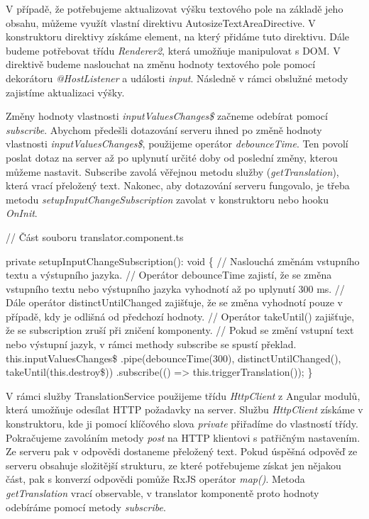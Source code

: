 V případě, že potřebujeme aktualizovat výšku textového pole na základě jeho obsahu, můžeme využít vlastní direktivu AutosizeTextAreaDirective. 
V konstruktoru direktivy získáme element, na který přidáme tuto direktivu. Dále budeme potřebovat třídu \emph{Renderer2}, která umožňuje manipulovat s DOM. 
V direktivě budeme naslouchat na změnu hodnoty textového pole pomocí dekorátoru \emph{@HostListener} a události \emph{input}. Následně v rámci obslužné metody zajistíme aktualizaci výšky.

Změny hodnoty vlastnosti \emph{inputValuesChanges\$} začneme odebírat pomocí \emph{subscribe}. 
Abychom předešli dotazování serveru ihned po změně hodnoty vlastnosti \emph{inputValuesChanges\$}, použijeme operátor \emph{debounceTime}. 
Ten povolí poslat dotaz na server až po uplynutí určité doby od poslední změny, kterou můžeme nastavit. 
Subscribe zavolá věřejnou metodu služby (\emph{getTranslation}), která vrací přeložený text. 
Nakonec, aby dotazování serveru fungovalo, je třeba metodu \emph{setupInputChangeSubscription} zavolat v konstruktoru nebo hooku \emph{OnInit}.

\begin{prog}
// Část souboru translator.component.ts

private setupInputChangeSubscription(): void \{
  // Naslouchá změnám vstupního textu a výstupního jazyka.
  // Operátor debounceTime zajistí, že se změna vstupního textu 
    nebo výstupního jazyka vyhodnotí až po uplynutí 300 ms.
  // Dále operátor distinctUntilChanged zajišťuje, 
    že se změna vyhodnotí pouze v případě, kdy je odlišná od předchozí hodnoty.
  // Operátor takeUntil() zajišťuje, 
    že se subscription zruší při zničení komponenty.
  // Pokud se změní vstupní text nebo výstupní jazyk, 
    v rámci methody subscribe se spustí překlad.
  this.inputValuesChanges\$
    .pipe(debounceTime(300), distinctUntilChanged(), takeUntil(this.destroy\$))
    .subscribe(() => this.triggerTranslation());
\}
\end{prog}

V rámci služby TranslationService použijeme třídu \emph{HttpClient} z Angular modulů, která umožňuje odesílat HTTP požadavky na server.
Službu \emph{HttpClient} získáme v konstruktoru, kde ji pomocí klíčového slova \emph{private} přiřadíme do vlastností třídy. 
Pokračujeme zavoláním metody \emph{post} na HTTP klientovi s patřičným nastavením. Ze serveru pak v odpovědi dostaneme přeložený text. 
Pokud úspěšná odpověď ze serveru obsahuje složitější strukturu, ze které potřebujeme získat jen nějakou část, pak s konverzí odpovědi pomůže RxJS operátor \emph{map()}. 
Metoda \emph{getTranslation} vrací observable, v translator komponentě proto hodnoty odebíráme pomocí metody \emph{subscribe}.

